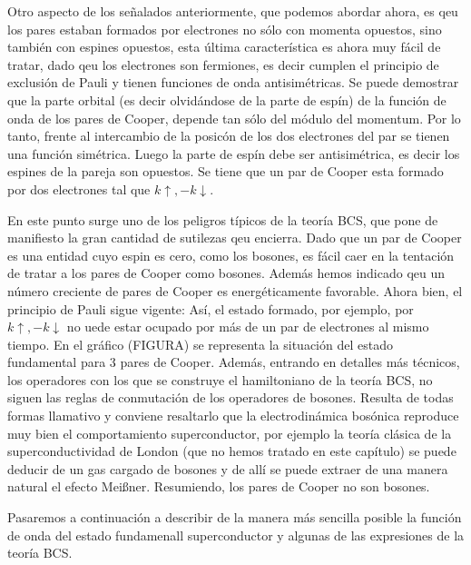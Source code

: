 Otro aspecto de los señalados anteriormente, que podemos abordar ahora, es qeu los pares estaban formados por electrones no sólo con momenta opuestos, sino también con espines opuestos, esta última característica es ahora muy fácil de tratar, dado qeu los electrones son fermiones, es decir cumplen el principio de exclusión de Pauli y tienen funciones de onda antisimétricas. Se puede demostrar que la parte orbital (es decir olvidándose de la parte de espín) de la función de onda de los pares de Cooper, depende tan sólo del módulo del momentum. Por lo tanto, frente al intercambio de la posicón de los dos electrones del par se tienen una función simétrica. Luego la parte de espín debe ser antisimétrica, es decir los espines de la pareja son opuestos. Se tiene que un par de Cooper esta formado por dos electrones tal que $k \uparrow, -k \downarrow$.

En este punto surge uno de los peligros típicos de la teoría BCS, que pone de manifiesto la gran cantidad de sutilezas qeu encierra. Dado que un par de Cooper es una entidad cuyo espin es cero, como los bosones, es fácil caer en la tentación de tratar a los pares de Cooper como bosones. Además hemos indicado qeu un número creciente de pares de Cooper es energéticamente favorable. Ahora bien, el principio de Pauli sigue vigente: Así, el estado formado, por ejemplo, por $k \uparrow, -k \downarrow$ no uede estar ocupado por más de un par de electrones al mismo tiempo. En el gráfico (FIGURA) se representa la situación del estado fundamental para 3 pares de Cooper. Además, entrando en detalles más técnicos, los operadores con los que se construye el hamiltoniano de la teoría BCS, no siguen las reglas de conmutación de los operadores de bosones. Resulta de todas formas llamativo y conviene resaltarlo que la electrodinámica bosónica reproduce muy bien el comportamiento superconductor, por ejemplo la teoría clásica de la superconductividad de London (que no hemos tratado en este capítulo) se puede deducir de un gas cargado de bosones y de allí se puede extraer de una manera natural el efecto Meißner. Resumiendo, los pares de Cooper no son bosones.

Pasaremos a continuación a describir de la manera más sencilla posible la función de onda del estado fundamenall superconductor y algunas de las expresiones de la teoría BCS.

